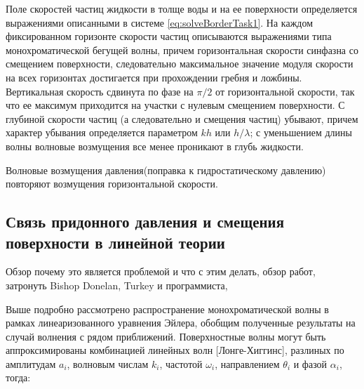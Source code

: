 Поле скоростей частиц жидкости в толще воды и на ее поверхности определяется выражениями описанными в системе \eqref{eq:solveBorderTask1}. На каждом фиксированном горизонте скорости частиц описываются выражениями типа монохроматической бегущей волны, причем горизонтальная скорости синфазна со смещением поверхности, следовательно максимальное значение модуля скорости на всех горизонтах достигается при прохождении гребня и ложбины. Вертикальная скорость сдвинута по фазе на $\pi/2$ от горизонтальной скорости, так что ее максимум приходится на участки с нулевым смещением поверхности. С глубиной скорости частиц (а следовательно и смещения частиц) убывают, причем характер убывания определяется параметром $kh$ или $h/\lambda$; с уменьшением длины волны волновые возмущения все менее проникают в глубь жидкости.

Волновые возмущения давления(поправка к гидростатическому давлению) повторяют возмущения горизонтальной скорости.
\subsection{Связь придонного давления и смещения поверхности в линейной теории}


Обзор почему это является проблемой и что с этим делать, обзор работ, затронуть Bishop Donelan, Turkey и программиста, \cite{Huang_press}


Выше подробно рассмотрено распространение монохроматической волны в рамках линеаризованного уравнения Эйлера, обобщим полученные результаты на случай волнения с рядом приближений. Поверхностные волны могут быть аппроксимированы комбинацией линейных волн [Лонге-Хиггинс], разлиных по амплитудам $a_i$, волновым числам $k_i$, частотой $\omega_i$, направлением $\theta_i$ и фазой $\alpha_i$, тогда:

